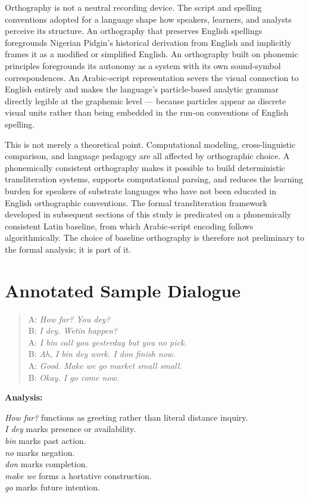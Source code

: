 \documentclass[12pt]{article}
\begin{document}
Orthography is not a neutral recording device. The script and spelling conventions adopted for a language shape how speakers, learners, and analysts perceive its structure. An orthography that preserves English spellings foregrounds Nigerian Pidgin's historical derivation from English and implicitly frames it as a modified or simplified English. An orthography built on phonemic principles foregrounds its autonomy as a system with its own sound-symbol correspondences. An Arabic-script representation severs the visual connection to English entirely and makes the language's particle-based analytic grammar directly legible at the graphemic level --- because particles appear as discrete visual units rather than being embedded in the run-on conventions of English spelling.

This is not merely a theoretical point. Computational modeling, cross-linguistic comparison, and language pedagogy are all affected by orthographic choice. A phonemically consistent orthography makes it possible to build deterministic transliteration systems, supports computational parsing, and reduces the learning burden for speakers of substrate languages who have not been educated in English orthographic conventions. The formal transliteration framework developed in subsequent sections of this study is predicated on a phonemically consistent Latin baseline, from which Arabic-script encoding follows algorithmically. The choice of baseline orthography is therefore not preliminary to the formal analysis; it is part of it.

\section{Annotated Sample Dialogue}

\begin{quote}
A: \textit{How far? You dey?} \\
B: \textit{I dey. Wetin happen?} \\
A: \textit{I bin call you yesterday but you no pick.} \\
B: \textit{Ah, I bin dey work. I don finish now.} \\
A: \textit{Good. Make we go market small small.} \\
B: \textit{Okay. I go come now.}
\end{quote}

\textbf{Analysis:}

\textit{How far?} functions as greeting rather than literal distance inquiry. \\
\textit{I dey} marks presence or availability. \\
\textit{bin} marks past action. \\
\textit{no} marks negation. \\
\textit{don} marks completion. \\
\textit{make we} forms a hortative construction. \\
\textit{go} marks future intention.
\end{document}
